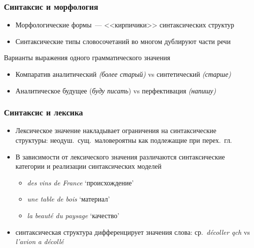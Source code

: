 \begin{frame}
  \frametitle{Синтаксис и морфология}

  \begin{itemize}
    \item Морфологические формы~--- <<кирпичики>> синтаксических структур
    \item Синтаксические типы словосочетаний во многом дублируют части речи
  \end{itemize}

  \vfill

  \begin{block}{Варианты выражения одного грамматического значения}
    \begin{itemize}
      \item Компаратив аналитический \textit{(более старый)} vs синтетический \textit{(старше)}
      \item Аналитическое будущее (\textit{буду писать}) vs перфективация \textit{(напишу)}
    \end{itemize}
  \end{block}
\end{frame}

\begin{frame}
  \frametitle{Синтаксис и лексика}

  \begin{itemize}
    \item Лексическое значение накладывает ограничения на синтаксические структуры: неодуш.\ сущ.\ маловероятны как подлежащие при перех.\ гл.
    \item В зависимости от лексического значения различаются синтаксические категории и реализации синтаксических моделей \begin{itemize}
      \item \textit{des vins de France} `происхождение'
      \item \textit{une table de bois} `материал'
      \item \textit{la beauté du paysage} `качество'
    \end{itemize}
    \item синтаксическая структура дифференцирует значения слова: ср.\ \textit{décoller qch} vs \textit{l'avion a décollé}
  \end{itemize}
\end{frame}

